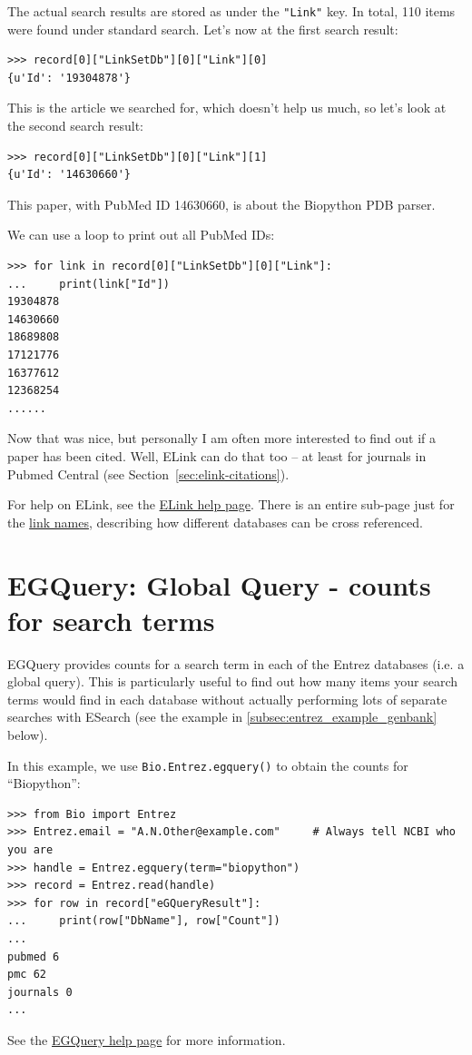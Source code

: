 \documentclass{report}
\begin{document}
The actual search results are stored as under the \verb+"Link"+ key. In total, 110 items were found under
standard search.
Let's now at the first search result:
\begin{verbatim}
>>> record[0]["LinkSetDb"][0]["Link"][0]
{u'Id': '19304878'}
\end{verbatim}

\noindent This is the article we searched for, which doesn't help us much, so let's look at the second search result:

\begin{verbatim}
>>> record[0]["LinkSetDb"][0]["Link"][1]
{u'Id': '14630660'}
\end{verbatim}

\noindent This paper, with PubMed ID 14630660, is about the Biopython PDB parser.

We can use a loop to print out all PubMed IDs:
\begin{verbatim}
>>> for link in record[0]["LinkSetDb"][0]["Link"]:
...     print(link["Id"])
19304878
14630660
18689808
17121776
16377612
12368254
......
\end{verbatim}

Now that was nice, but personally I am often more interested to find out if a paper has been cited.
Well, ELink can do that too -- at least for journals in Pubmed Central (see Section~\ref{sec:elink-citations}).

For help on ELink, see the \href{http://www.ncbi.nlm.nih.gov/entrez/query/static/elink\_help.html}{ELink help page}.
There is an entire sub-page just for the \href{http://eutils.ncbi.nlm.nih.gov/corehtml/query/static/entrezlinks.html}{link names}, describing how different databases can be cross referenced.

\section{EGQuery: Global Query - counts for search terms}
EGQuery provides counts for a search term in each of the Entrez databases (i.e. a global query). This is particularly useful to find out how many items your search terms would find in each database without actually performing lots of separate searches with ESearch (see the example in \ref{subsec:entrez_example_genbank} below).

In this example, we use \verb+Bio.Entrez.egquery()+ to obtain the counts for ``Biopython'':

\begin{verbatim}
>>> from Bio import Entrez
>>> Entrez.email = "A.N.Other@example.com"     # Always tell NCBI who you are
>>> handle = Entrez.egquery(term="biopython")
>>> record = Entrez.read(handle)
>>> for row in record["eGQueryResult"]:
...     print(row["DbName"], row["Count"])
... 
pubmed 6
pmc 62
journals 0
...
\end{verbatim}
See the \href{http://www.ncbi.nlm.nih.gov/entrez/query/static/egquery\_help.html}{EGQuery help page} for more information.
\end{document}
